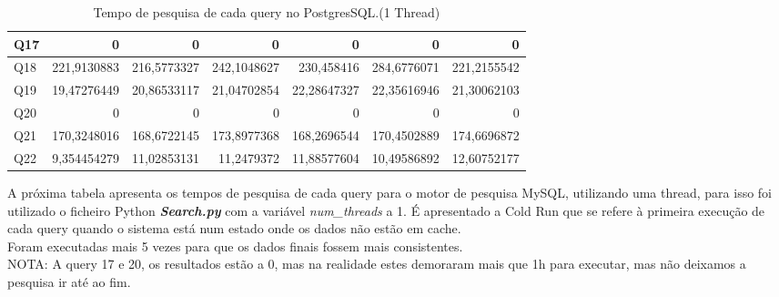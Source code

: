\documentclass{article}
\begin{document}
\begin{table}[H]
{\begin{tabular}{|l|r|r|r|r|r|r|}
        Q17	&	0	&0&	0		&0 & 0 & 0\\ \hline
        Q18	&221,9130883	&216,5773327&	242,1048627&	230,458416	&284,6776071 &	221,2155542\\ \hline
        Q19	&19,47276449&	20,86533117	&21,04702854	&22,28647327&	22,35616946&	21,30062103\\ \hline
        Q20	&	0	&0&	0		&0 & 0 & 0\\ \hline
        Q21&	170,3248016&		168,6722145	&	173,8977368&		168,2696544	&	170,4502889	&	174,6696872\\ \hline
        Q22	&9,354454279&	11,02853131	&11,2479372&	11,88577604&	10,49586892	&12,60752177\\ \hline
      \end{tabular}}
      
    \caption{Tempo de pesquisa de cada query no PostgresSQL.(1 Thread)}
    \label{tab:BC_Table3}
  \end{table}
\clearpage

\quad A próxima tabela apresenta os tempos de pesquisa de cada query para o motor de pesquisa MySQL, utilizando uma thread, para isso foi utilizado o ficheiro Python \textbf{\textit{Search.py}}  com a variável \textit{num\_threads} a 1. 
\quad É apresentado a Cold Run que se refere à primeira execução de cada query quando o sistema está num estado onde os dados não estão em cache.\\
Foram executadas mais 5 vezes para que os dados finais fossem mais consistentes.\\
NOTA: A query 17 e 20, os resultados estão a 0, mas na realidade estes demoraram mais que 1h para executar, mas não deixamos a pesquisa ir até ao fim.
\end{document}
